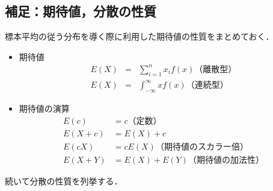 \newpage

\subsection{補足：期待値，分散の性質}

標本平均の従う分布を導く際に利用した期待値の性質をまとめておく．

\begin{itemize}
  \item 期待値
        \begin{eqnarray}
          E(X) & = & \sum_{i=1}^{n} x_i f(x)（離散型）\\
          E(X) & = & \int_{-\infty}^{\infty} x f(x)（連続型）
        \end{eqnarray}
  \item 期待値の演算
        \begin{equation}
          \begin{aligned}
            E(c)     & = c（定数）                     \\
            E(X + c) & = E(X) + c                      \\
            E(cX)    & = c E(X)（期待値のスカラー倍）  \\
            E(X + Y) & = E(X) + E(Y)（期待値の加法性）
          \end{aligned}
        \end{equation}
\end{itemize}

続いて分散の性質を列挙する．

